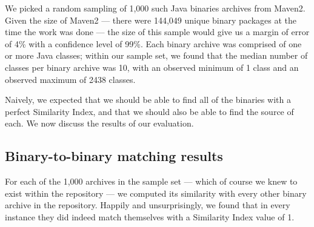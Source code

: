 We picked a random sampling of 1,000 such Java binaries archives from
Maven2. Given the size of Maven2 --- there were 144,049 unique binary
packages at the time the work was done --- the size of this sample would
give us a  margin of error of 4\% with a confidence level of 99\%.  Each
binary archive was comprised of one or more Java classes; within our sample
set, we found that the median number of classes per binary archive was 10,
with an observed minimum of 1 class and an observed maximum of 2438
classes.

Naively, we expected that we should be able to find all of the binaries
with a perfect Similarity Index, and that we should also be able to find
the source of each.  We now discuss the results of our evaluation.


\subsection{Binary-to-binary matching results}

For each of the 1,000 archives in the sample set --- which of course we
knew to exist within the repository --- we computed its similarity with
every other binary archive in the repository.  Happily and unsurprisingly,
we found that in every instance they did indeed match themselves with a
Similarity Index value of 1.

